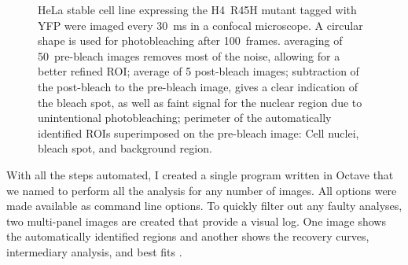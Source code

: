 \begin{figure}
  \centering
  \hfill
  \hfill
               {HeLa stable cell line expressing the H4~R45H mutant
                 tagged with YFP were imaged every \SI{30}{\ms} in a
                 confocal microscope. A circular shape is used for
                 photobleaching after 100~frames.
                 averaging of 50~pre-bleach images removes most of the
                 noise, allowing for a better refined ROI;
                 average of 5 post-bleach images;
                 subtraction of the post-bleach to the pre-bleach
                 image, gives a clear indication of the bleach spot,
                 as well as faint signal for the nuclear region due to
                 unintentional photobleaching;
                 perimeter of the automatically identified ROIs
                 superimposed on the pre-bleach image: Cell nuclei,
                 bleach spot, and background region.  }
               \label{fig:software:frap-roi}
\end{figure}


With all the steps automated, I created a single program written in Octave
that we named  to perform all the
analysis for any number of images.  All options were made
available as command line options.
To quickly filter out any faulty analyses, two multi-panel
images are created that provide a visual log.  One image shows the
automatically identified regions  and
another shows the recovery curves, intermediary analysis, and best fits
.

